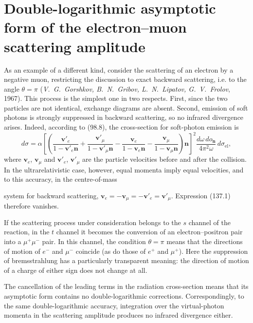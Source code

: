 \section{Double-logarithmic asymptotic form of the electron--muon scattering amplitude}

As an example of a different kind, consider the scattering of an electron by a negative muon, restricting the discussion to exact backward scattering, i.e. to the angle $\theta=\pi$ (\emph{V.~G.~Gorshkov, B.~N.~Gribov, L.~N.~Lipatov, G.~V.~Frolov}, 1967). This process is the simplest one in two respects. First, since the two particles are not identical, exchange diagrams are absent. Second, emission of soft photons is strongly suppressed in backward scattering, so no infrared divergence arises. Indeed, according to (98.8), the cross-section for soft-photon emission is
\begin{equation}
d\sigma=\alpha\left[\left(
\frac{\mathbf v'_e}{1-\mathbf v'_e\mathbf n}
+\frac{\mathbf v'_\mu}{1-\mathbf v'_\mu\mathbf n}
-\frac{\mathbf v_e}{1-\mathbf v_e\mathbf n}
-\frac{\mathbf v_\mu}{1-\mathbf v_\mu\mathbf n}
\right)\mathbf n\right]^2
\frac{d\omega\,do_{\mathbf n}}{4\pi^2\omega}\,d\sigma_{\text{el}},
\tag{137.1}
\end{equation}
where $\mathbf v_e$, $\mathbf v_\mu$ and $\mathbf v'_e$, $\mathbf v'_\mu$ are the particle velocities before and after the collision. In the ultrarelativistic case, however, equal momenta imply equal velocities, and to this accuracy, in the centre-of-mass

system for backward scattering, $\mathbf v_e=-\mathbf v_\mu=-\mathbf v'_e=\mathbf v'_\mu$. Expression (137.1) therefore vanishes.

If the scattering process under consideration belongs to the $s$ channel of the reaction, in the $t$ channel it becomes the conversion of an electron--positron pair into a $\mu^+\mu^-$ pair. In this channel, the condition $\theta=\pi$ means that the directions of motion of $e^-$ and $\mu^-$ coincide (as do those of $e^+$ and $\mu^+$). Here the suppression of bremsstrahlung has a particularly transparent meaning: the direction of motion of a charge of either sign does not change at all.

The cancellation of the leading terms in the radiation cross-section means that its asymptotic form contains no double-logarithmic corrections. Correspondingly, to the same double-logarithmic accuracy, integration over the virtual-photon momenta in the scattering amplitude produces no infrared divergence either.

